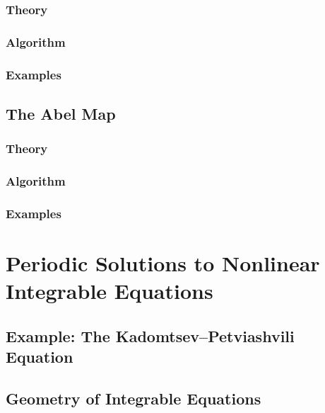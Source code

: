 \documentclass{article}
\begin{document}
%
\subsubsection{Theory}
%
%
\subsubsection{Algorithm}
%
%
\subsubsection{Examples}
%

\subsection{The Abel Map}

%
\subsubsection{Theory}
%
%
\subsubsection{Algorithm}
%
%
\subsubsection{Examples}
%

\section{Periodic Solutions to Nonlinear Integrable Equations}

\subsection{Example: The Kadomtsev--Petviashvili Equation}

\subsection{Geometry of Integrable Equations}
\end{document}
